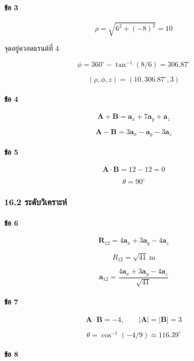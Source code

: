 \paragraph{ข้อ 3}

\[
\rho=\sqrt{6^2+(-8)^2}=10
\]

จุดอยู่ควอดแรนต์ที่ 4

\[
\phi=360^\circ-\tan^{-1}(8/6)=306.87^\circ
\]

\[
\boxed{(\rho,\phi,z)=(10,306.87^\circ,3)}
\]

\paragraph{ข้อ 4}

\[
\boxed{\mathbf{A}+\mathbf{B}=\mathbf{a}_x+7\mathbf{a}_y+\mathbf{a}_z}
\]

\[
\boxed{\mathbf{A}-\mathbf{B}=3\mathbf{a}_x-\mathbf{a}_y-3\mathbf{a}_z}
\]

\paragraph{ข้อ 5}

\[
\mathbf{A}\cdot\mathbf{B}=12-12=0
\]

\[
\boxed{\theta=90^\circ}
\]

\subsubsection{16.2 ระดับวิเคราะห์}

\paragraph{ข้อ 6}

\[
\mathbf{R}_{12}=4\mathbf{a}_x+3\mathbf{a}_y-4\mathbf{a}_z
\]

\[
R_{12}=\sqrt{41}\ \text{m}
\]

\[
\boxed{\mathbf{a}_{12}=\frac{4\mathbf{a}_x+3\mathbf{a}_y-4\mathbf{a}_z}{\sqrt{41}}}
\]

\paragraph{ข้อ 7}

\[
\mathbf{A}\cdot\mathbf{B}=-4,\qquad |\mathbf{A}|=|\mathbf{B}|=3
\]

\[
\boxed{\theta=\cos^{-1}(-4/9)\approx116.39^\circ}
\]

\paragraph{ข้อ 8}

